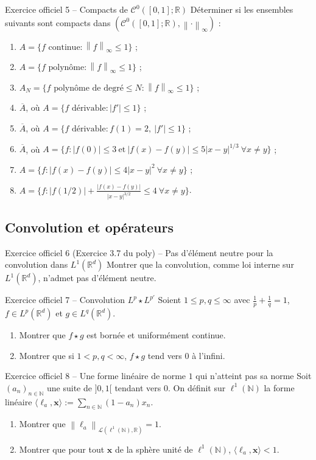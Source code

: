 \documentclass[11pt,a4paper]{article}
\newcommand{\R}{\mathbb{R}}
\newcommand{\N}{\mathbb{N}}
\newcommand{\adh}[1]{\overline{#1}}
\newcommand{\norm}[1]{\left\|#1\right\|}
\newcommand{\Lc}{\mathcal{L}}
\newcommand{\Cz}{\mathcal{C}^0}
\theoremstyle{definition}
\begin{document}
\begin{exo}{Exercice officiel 5 -- Compacts de $\Cz([0,1];\R)$}
Déterminer si les ensembles suivants sont compacts dans $(\Cz([0,1];\R),\norm\cdot_\infty)$ :
\begin{enumerate}[label=(\alph*)]
  \item $A=\{f\text{ continue} : \norm f_\infty\le1\}$ ;
  \item $A=\{f\text{ polynôme} : \norm f_\infty\le1\}$ ;
  \item $A_N=\{f\text{ polynôme de degré}\le N : \norm f_\infty\le1\}$ ;
  \item $\adh A$, où $A=\{f\text{ dérivable} : |f'|\le1\}$ ;
  \item $\adh A$, où $A=\{f\text{ dérivable} : f(1)=2,\ |f'|\le1\}$ ;
  \item $\adh A$, où $A=\{f : |f(0)|\le3\ \text{et}\ |f(x)-f(y)|\le5|x-y|^{1/3}\ \forall x\ne y\}$ ;
  \item $A=\{f : |f(x)-f(y)|\le4|x-y|^2\ \forall x\ne y\}$ ;
  \item $A=\{f : |f(1/2)|+\frac{|f(x)-f(y)|}{|x-y|^{3/2}}\le4\ \forall x\ne y\}$.
\end{enumerate}
\end{exo}

\subsection*{Convolution et opérateurs}

\begin{exo}{Exercice officiel 6 (Exercice 3.7 du poly) -- Pas d'élément neutre pour la convolution dans $L^1(\R^d)$}
Montrer que la convolution, comme loi interne sur $L^1(\R^d)$, n'admet pas d'élément neutre.
\end{exo}

\begin{exo}{Exercice officiel 7 -- Convolution $L^p\star L^{p'}$}
Soient $1\le p,q\le\infty$ avec $\frac1p+\frac1q=1$, $f\in L^p(\R^d)$ et $g\in L^q(\R^d)$.
\begin{enumerate}[label=(\alph*)]
  \item Montrer que $f\star g$ est bornée et uniformément continue.
  \item Montrer que si $1<p,q<\infty$, $f\star g$ tend vers $0$ à l'infini.
\end{enumerate}
\end{exo}

\begin{exo}{Exercice officiel 8 -- Une forme linéaire de norme $1$ qui n'atteint pas sa norme}
Soit $(a_n)_{n\in\N}$ une suite de $]0,1[$ tendant vers $0$. On définit sur $\ell^1(\N)$ la forme linéaire $\langle\ell_a,\mathbf x\rangle:=\sum_{n\in\N}(1-a_n)x_n$.
\begin{enumerate}[label=\alph*)]
  \item Montrer que $\norm{\ell_a}_{\Lc(\ell^1(\N),\R)}=1$.
  \item Montrer que pour tout $\mathbf x$ de la sphère unité de $\ell^1(\N)$, $\langle\ell_a,\mathbf x\rangle<1$.
\end{enumerate}
\end{exo}
\end{document}
